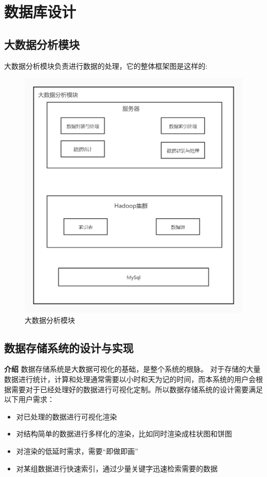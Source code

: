 \newpage
\section{数据库设计}

\subsection{大数据分析模块}
大数据分析模块负责进行数据的处理，它的整体框架图是这样的:
\begin{figure}[!htbp]
	\centering
	\includegraphics[scale=0.5]{image/d1.png}
	\caption{大数据分析模块}
\end{figure}

\subsection{数据存储系统的设计与实现}
\textbf{介绍}
数据存储系统是大数据可视化的基础，是整个系统的根脉。
对于存储的大量数据进行统计，计算和处理通常需要以小时和天为记的时间，而本系统的用户会根据需要对于已经处理好的数据进行可视化定制。所以数据存储系统的设计需要满足以下用户需求：
\begin{itemize}
	\item 对已处理的数据进行可视化渲染
	\item 对结构简单的数据进行多样化的渲染，比如同时渲染成柱状图和饼图
	\item 对渲染的低延时需求，需要“即做即画”
	\item 对某组数据进行快速索引，通过少量关键字迅速检索需要的数据
\end{itemize}

